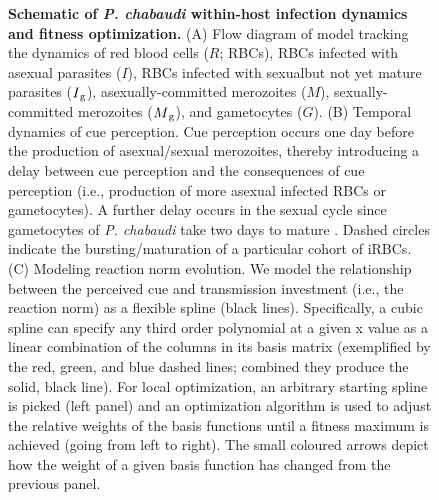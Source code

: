\documentclass[10pt,letterpaper]{article}
\begin{document}
\begin{figure}[!h]
\caption{{\bf Schematic of \emph{P. chabaudi} within-host infection dynamics and fitness optimization.}
(A) Flow diagram of model tracking the dynamics of red blood cells ($R$; RBCs), RBCs infected with asexual parasites ($I$), RBCs infected with sexual\textemdash but not yet mature
\textemdash parasites ($I\textsubscript{g}$), asexually-committed merozoites ($M$), sexually-committed merozoites ($M\textsubscript{g}$), and gametocytes ($G$). (B) Temporal dynamics of cue perception. Cue perception occurs one day before the production of asexual/sexual merozoites, thereby introducing a delay between cue perception and the consequences of cue perception (i.e., production of more asexual infected RBCs or gametocytes). A further delay occurs in the sexual cycle since gametocytes of \emph{P. chabaudi} take two days to mature \cite{lensen_plasmodium_1999}. Dashed circles indicate the bursting/maturation of a particular cohort of iRBCs. (C) Modeling reaction norm evolution. We model the relationship between the perceived cue and transmission investment (i.e., the reaction norm) as a flexible spline (black lines). Specifically, a cubic spline can specify any third order polynomial at a given x value as a linear combination of the columns in its basis matrix \cite{de_boor_practical_2001} (exemplified by the red, green, and blue dashed lines; combined they produce the solid, black line). For local optimization, an arbitrary starting spline is picked (left panel) and an optimization algorithm is used to adjust the relative weights of the basis functions until a fitness maximum is achieved (going from left to right). The small coloured arrows depict how the weight of a given basis function has changed from the previous panel.}
\label{fig1}
\end{figure}
\end{document}
